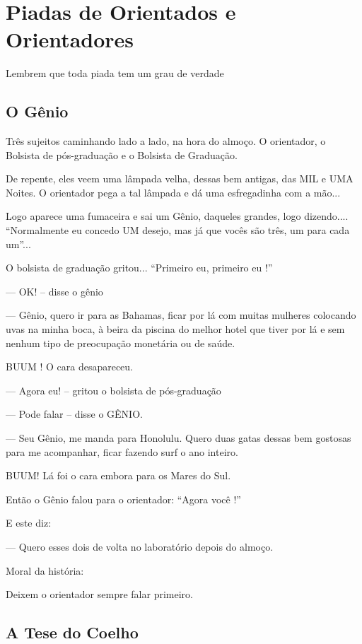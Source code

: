 	\chapter{Piadas de Orientados e Orientadores}

Lembrem que toda piada tem um grau de verdade

\section{O Gênio }

Três sujeitos caminhando lado a lado, na hora do almoço. O orientador, o Bolsista de pós-graduação e o Bolsista de Graduação.

De repente, eles veem uma lâmpada velha, dessas bem antigas, das MIL e UMA Noites. O orientador pega a tal lâmpada e dá uma esfregadinha com a mão...

Logo aparece uma fumaceira e sai um Gênio, daqueles grandes, logo dizendo.... ``Normalmente eu concedo UM desejo, mas já que vocês são três, um para cada um''...

O bolsista de graduação gritou... ``Primeiro eu, primeiro eu !''

--- OK! -- disse o gênio

--- Gênio, quero ir para as Bahamas, ficar por lá com muitas mulheres colocando uvas na minha boca, à beira da piscina do melhor hotel que tiver por lá e sem nenhum tipo de preocupação monetária ou de saúde.

BUUM ! O cara desapareceu.

--- Agora eu! -- gritou o bolsista de pós-graduação

--- Pode falar -- disse o GÊNIO.

--- Seu Gênio, me manda para Honolulu. Quero duas gatas dessas bem gostosas para me acompanhar, ficar fazendo surf o ano inteiro.

BUUM! Lá foi o cara embora para os Mares do Sul.

Então o Gênio falou para o orientador: ``Agora você !''

E este diz:

--- Quero esses dois de volta no laboratório depois do almoço.

Moral da história:

Deixem o orientador sempre falar primeiro.

\section{A Tese do Coelho}

